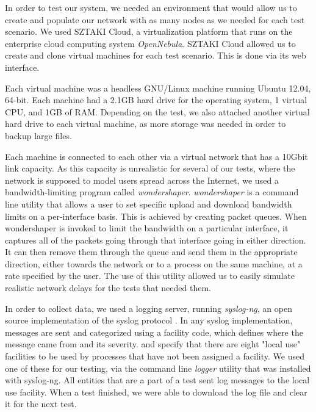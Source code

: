 \documentclass[12pt]{report}
\begin{document}

In order to test our system, we needed an environment that would allow us to create and populate our network with as many nodes as we needed for each test scenario. We used SZTAKI Cloud, a virtualization platform that runs on the enterprise cloud computing system \textit{OpenNebula}. SZTAKI Cloud allowed us to create and clone virtual machines for each test scenario. This is done via its web interface. %

Each virtual machine was a headless GNU/Linux machine running Ubuntu 12.04, 64-bit. Each machine had a 2.1GB hard drive for the operating system, 1 virtual CPU, and 1GB of RAM. Depending on the test, we also attached another virtual hard drive to each virtual machine, as more storage was needed in order to backup large files.

Each machine is connected to each other via a virtual network that has a 10Gbit link capacity. As this capacity is unrealistic for several of our tests, where the network is supposed to model users spread across the Internet, we used a bandwidth-limiting program called \textit{wondershaper}. \textit{wondershaper} is a command line utility that allows a user to set specific upload and download bandwidth limits on a per-interface basis. This is achieved by creating packet queues. When wondershaper is invoked to limit the bandwidth on a particular interface, it captures all of the packets going through that interface going in either direction. It can then remove them through the queue and send them in the appropriate direction, either towards the network or to a process on the same machine, at a rate specified by the user. The use of this utility allowed us to easily simulate realistic network delays for the tests that needed them.

In order to collect data, we used a logging server, running \textit{syslog-ng}, an open source implementation of the syslog protocol \cite{syslogRFC1,syslogRFC2}. In any syslog implementation, messages are sent and categorized using a facility code, which defines where the message came from and its severity. \cite{syslogRFC1} and \cite{syslogRFC2} specify that there are eight "local use" facilities to be used by processes that have not been assigned a facility. We used one of these for our testing, via the command line \textit{logger} utility that was installed with syslog-ng. All entities that are a part of a test sent log messages to the local use facility. When a test finished, we were able to download the log file and clear it for the next test.
\end{document}
